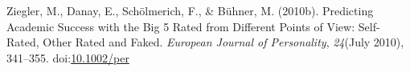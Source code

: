 \documentclass[,man,floatsintext]{apa6}
\theoremstyle{definition}
\theoremstyle{definition}
\theoremstyle{definition}
\theoremstyle{remark}
\begin{document}
\leavevmode\hypertarget{ref-Ziegler2010}{}%
Ziegler, M., Danay, E., Schölmerich, F., \& Bühner, M. (2010b).
Predicting Academic Success with the Big 5 Rated from Different Points
of View: Self-Rated, Other Rated and Faked. \emph{European Journal of
Personality}, \emph{24}(July 2010), 341--355.
doi:\href{https://doi.org/10.1002/per}{10.1002/per}

\endgroup

\clearpage

\renewcommand{\listtablename}{Table captions}

\listoftables
\end{document}
